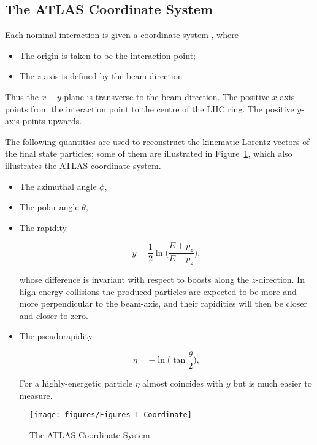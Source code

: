 


\subsection{The ATLAS Coordinate System}

Each nominal interaction is given a coordinate system \cite{lhcaccexp}, where

\begin{itemize}
	\item The origin is taken to be the interaction point;
	\item The $z$-axis is defined by the beam direction
\end{itemize}

Thus the $x-y$ plane is transverse to the beam direction. The positive $x$-axis
points from the interaction point to the centre of the LHC ring. The positive
$y$-axis points upwards.

The following quantities are used to reconstruct the kinematic Lorentz vectors
of the final state particles; some of them are illustrated in
Figure~\ref{f:atlasc}, which also illustrates the ATLAS coordinate system.


\begin{itemize}
	\item The azimuthal angle $\phi$,
	\item The polar angle $\theta$,
	\item The rapidity

	      $$
		      y = \frac{1}{2}\ln\bigg( \frac{E + p_z}{E - p_z}\bigg),
	      $$

	      whose difference is invariant with respect to boosts along the $z$-direction.
	      In high-energy collisions the produced particles are expected to be more and
	      more perpendicular to the beam-axis, and their rapidities will then be closer
	      and closer to zero.

	\item The pseudorapidity

	      $$
		      \eta = -\ln\bigg( \tan \frac{\theta}{2}\bigg),
	      $$

	      For a highly-energetic particle $\eta$ almost coincides with $y$ but is much
	      easier to measure.

\end{itemize}

\begin{figure}[H]
	\texttt{[image: figures/Figures\_T\_Coordinate]}
	\centering
	\caption{The ATLAS Coordinate System~\cite{}}
	\label{f:atlasc}
\end{figure}


